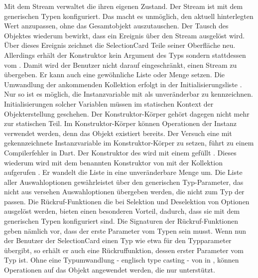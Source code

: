 Mit dem Stream  verwaltet die  ihren eigenen Zustand. Der Stream ist mit dem generischen Typen  konfiguriert. Das macht es unmöglich, den aktuell hinterlegten Wert anzupassen, ohne das Gesamtobjekt auszutauschen. Der Tausch des Objektes wiederum bewirkt, dass ein Ereignis über den Stream ausgelöst wird. Über dieses Ereignis zeichnet die SelectionCard Teile seiner Oberfläche neu. Allerdings erhält der Konstruktor kein Argument des Typs  sondern stattdessen vom  . Damit wird der Benutzer nicht darauf eingeschränkt, einen Stream zu übergeben. Er kann auch eine gewöhnliche Liste oder Menge setzen. Die Umwandlung der ankommenden Kollektion erfolgt in der Initialisierungsliste . Nur so ist es möglich, die Instanzvariable mit  als unveränderbar zu kennzeichnen. Initialisierungen solcher Variablen müssen im statischen Kontext der Objekterstellung geschehen. Der Konstruktor-Körper gehört dagegen nicht mehr zur statischen Teil. Im Konstruktor-Körper können Operationen der Instanz verwendet werden, denn das Objekt existiert bereits. Der Versuch eine mit  gekennzeichnete Instanzvariable im Konstruktor-Körper zu setzen, führt zu einem Compilerfehler in Dart. Der Konstruktor  des  wird mit einem  gefüllt . Dieses wiederum wird mit dem benannten Konstruktor  von  mit der Kollektion aufgerufen . Er wandelt die  Liste in eine unveränderbare Menge um. Die Liste aller Auswahloptionen   gewährleistet über den generischen Typ-Parameter, das nicht aus versehen Auswahloptionen übergeben werden, die nicht zum Typ der  passen. Die Rückruf-Funktionen  die bei Selektion und Deselektion von Optionen ausgelöst werden, bieten einen besonderen Vorteil, dadurch, dass sie mit dem generischen Typen konfiguriert sind. Die Signaturen der Rückruf-Funktionen  geben nämlich vor, dass der erste Parameter vom Typen  sein musst. Wenn nun der Benutzer der SelectionCard einen Typ wie etwa  für den Typparameter übergibt, so erhält er auch eine Rückruffunktion, dessen erster Parameter vom Typ  ist. Ohne eine Typumwandlung - englisch type casting - von  in , können Operationen auf das Objekt angewendet werden, die nur  unterstützt. 

